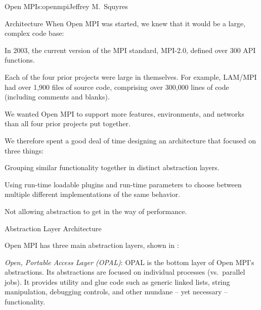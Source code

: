\begin{aosachapter}{Open MPI}{s:openmpi}{Jeffrey M.\ Squyres}
\begin{aosasect1}{Architecture}
When Open MPI was started, we knew that it would be a large, complex
code base:

\begin{aosaitemize}
\item In 2003, the current version of the MPI standard, MPI-2.0,
  defined over 300 API functions.
\item Each of the four prior projects were large in themselves.  For
  example, LAM/MPI had over 1,900 files of source code, comprising
  over 300,000 lines of code (including comments and blanks).
\item We wanted Open MPI to support more features, environments, and
  networks than all four prior projects put together.
\end{aosaitemize}

We therefore spent a good deal of time designing an architecture that
focused on three things:

\begin{aosaenumerate}
\item Grouping similar functionality together in distinct abstraction
  layers.
\item Using run-time loadable plugins and run-time parameters to
  choose between multiple different implementations of the same
  behavior.
\item Not allowing abstraction to get in the way of performance.
\end{aosaenumerate}


\begin{aosasect2}{Abstraction Layer Architecture}


Open MPI has three main abstraction layers, shown in
:

\begin{aosaitemize}
\item \emph{Open, Portable Access Layer (OPAL)}: OPAL is the bottom
  layer of Open MPI's abstractions.  Its abstractions are focused on
  individual processes (vs.\ parallel jobs).  It provides utility and
  glue code such as generic linked lists, string manipulation,
  debugging controls, and other mundane -- yet necessary --
  functionality.


\end{aosaitemize}
\end{aosasect2}
\end{aosasect1}
\end{aosachapter}
